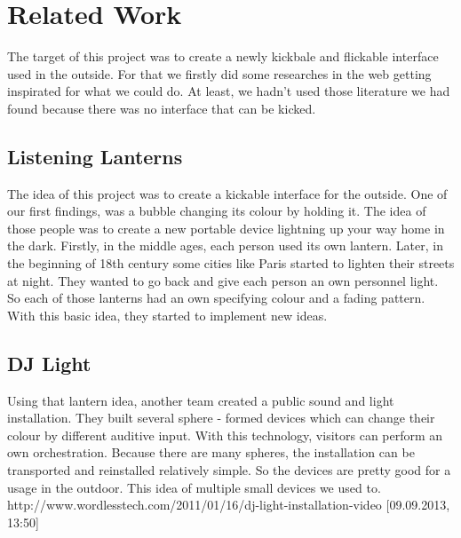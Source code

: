 \section{Related Work}
The target of this project was to create a newly kickbale and flickable interface used in the outside. For that we firstly did some researches in the web getting inspirated for what we could do.
At least, we hadn't used those literature we had found because there was no interface that can be kicked.
 
\subsection{Listening Lanterns}
The idea of this project was to create a kickable interface for the outside. One of our first findings, was a bubble changing its colour by holding it. The idea of those people was to create a new portable device lightning up your way home in the dark. Firstly, in the middle ages, each person used its own lantern. Later, in the beginning of 18th century some cities like Paris started to lighten their streets at night. They wanted to go back and give each person an own personnel light. So each of those lanterns had an own specifying colour and a fading pattern.\newline
With this basic idea, they started to implement new ideas. \newline

\subsection{DJ Light}


Using that lantern idea, another team created a public sound and light installation.\newline
They built several sphere - formed devices which can change their colour by different auditive input. With this technology, visitors can perform an own orchestration. Because there are many spheres, the installation can be transported and reinstalled relatively simple. So the devices are pretty good for a usage in the outdoor.\newline
This idea of multiple small devices we used to. \newline 
http://www.wordlesstech.com/2011/01/16/dj-light-installation-video [09.09.2013, 13:50]\newline

